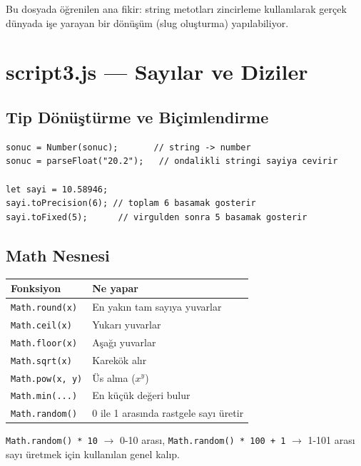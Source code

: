 \documentclass[11pt,a4paper]{article}
\begin{document}
Bu dosyada öğrenilen ana fikir: string metotları zincirleme kullanılarak gerçek dünyada işe yarayan bir dönüşüm (slug oluşturma) yapılabiliyor.

\newpage

\section{script3.js --- Sayılar ve Diziler}

\subsection*{Tip Dönüştürme ve Biçimlendirme}

\begin{lstlisting}
sonuc = Number(sonuc);       // string -> number
sonuc = parseFloat("20.2");   // ondalikli stringi sayiya cevirir

let sayi = 10.58946;
sayi.toPrecision(6); // toplam 6 basamak gosterir
sayi.toFixed(5);      // virgulden sonra 5 basamak gosterir
\end{lstlisting}

\subsection*{Math Nesnesi}

\begin{center}
\begin{tabular}{@{}p{4cm}p{9.5cm}@{}}
\toprule
\textbf{Fonksiyon} & \textbf{Ne yapar} \\
\midrule
\texttt{Math.round(x)} & En yakın tam sayıya yuvarlar \\
\texttt{Math.ceil(x)} & Yukarı yuvarlar \\
\texttt{Math.floor(x)} & Aşağı yuvarlar \\
\texttt{Math.sqrt(x)} & Karekök alır \\
\texttt{Math.pow(x, y)} & Üs alma ($x^y$) \\
\texttt{Math.min(...)} & En küçük değeri bulur \\
\texttt{Math.random()} & 0 ile 1 arasında rastgele sayı üretir \\
\bottomrule
\end{tabular}
\end{center}

\begin{dikkat}
\texttt{Math.random() * 10} $\rightarrow$ 0-10 arası, \texttt{Math.random() * 100 + 1} $\rightarrow$ 1-101 arası sayı üretmek için kullanılan genel kalıp.
\end{dikkat}
\end{document}
